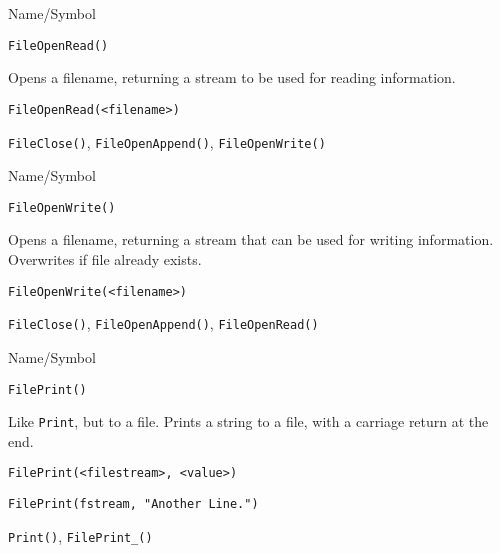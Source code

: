 \begin{desc}{Name/Symbol}
\item[Name/Symbol]	\verb+FileOpenRead()+

\item[Description]  	Opens a filename, returning  a stream to be used 
		for reading information.

\item[Usage]
\begin{verbatim}
FileOpenRead(<filename>)
\end{verbatim}

\item[Example]	

\item[See Also]	\verb+FileClose()+, \verb+FileOpenAppend()+, \verb+FileOpenWrite()+
\end{desc}

\rl


\begin{desc}{Name/Symbol}
\item[Name/Symbol]	\verb+FileOpenWrite()+

\item[Description] Opens a filename, returning a stream that can be
  used for writing information.  Overwrites if file already exists.

\item[Usage]
\begin{verbatim}
FileOpenWrite(<filename>)
\end{verbatim}

\item[Example]	

\item[See Also]	\verb+FileClose()+, \verb+FileOpenAppend()+, \verb+FileOpenRead()+
\end{desc}

\rl




\begin{desc}{Name/Symbol}
\item[Name/Symbol]	\verb+FilePrint()+

\item[Description]	Like \verb+Print+, but to a file.  Prints a string to a file, 
		with a carriage return at the end.
	
\item[Usage]
\begin{verbatim}
FilePrint(<filestream>, <value>)
\end{verbatim}

\item[Example]
\begin{verbatim}
FilePrint(fstream, "Another Line.")
\end{verbatim}

\item[See Also]	\verb+Print()+, \verb+FilePrint_()+
\end{desc}

